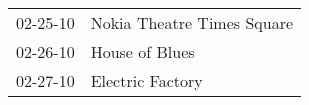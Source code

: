 \begin{supertabular}{p{0.25\columnwidth}p{0.75\columnwidth}}
 02-25-10 &  Nokia Theatre Times Square \\
 02-26-10 &              House of Blues \\
 02-27-10 &            Electric Factory \\
\end{supertabular}
